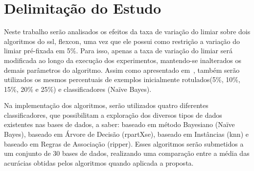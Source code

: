 \section{Delimitação do Estudo}
    \label{sec:delimitacao-estudo}


    Neste trabalho serão analisados os efeitos da taxa de variação do limiar sobre dois algoritmos do \ac{ssl}, \ac{flexcon}, uma vez que ele possui como restrição a variação do limiar pré\hyp{fixada} em 5\%. Para isso, apenas a taxa de variação do limiar será modificada ao longo da execução dos experimentos, mantendo-se inalterados os demais parâmetros do algoritmo. Assim como apresentado em~, também serão utilizados os mesmos percentuais de exemplos inicialmente rotulados(5\%, 10\%, 15\%, 20\% e 25\%) e classificadores (Na\"ive Bayes).

   Na implementação dos algoritmos, serão utilizados quatro diferentes classificadores, que possibilitam a exploração dos diversos tipos de dados existentes nas bases de dados, a saber: baseado em método Bayesiano (Na\"ive Bayes), baseado em Árvore de Decisão (rpartXse), baseado em Instâncias (\ac{knn}) e baseado em Regras de Associação (\ac{ripper}). Esses algoritmos serão submetidos a um conjunto de 30 bases de dados, realizando uma comparação entre a média das acurácias obtidas pelos algoritmos quando aplicada a proposta.
